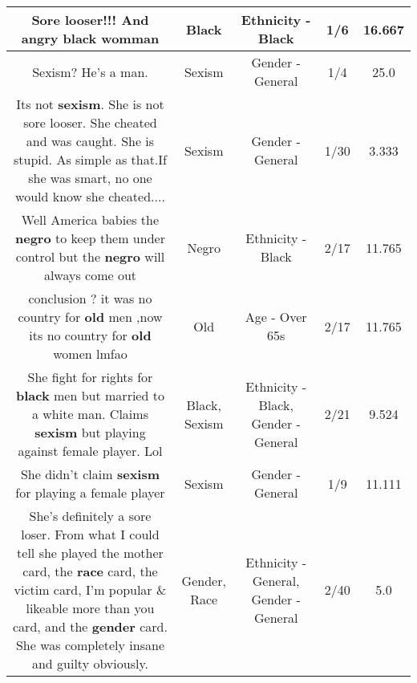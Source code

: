 \documentclass[11pt]{article}
\newlength\mylength
\begin{document}
\begin{center}
\begin{longtable}{|C{.65\mylength}|C{.30\mylength}|C{.12\mylength}|C{.12\mylength}|C{.12\mylength}|}
  \small Sore looser!!! And angry \textbf{black} womman\normalsize   & Black & Ethnicity - Black & 1/6 & 16.667 \\  \hline
  \small Sexism? He's a man.\normalsize   & Sexism & Gender - General & 1/4 & 25.0 \\  \hline
  \small Its not \textbf{sexism}. She is not sore looser. She cheated and was caught. She is stupid. As simple as that.If she was smart, no one would know she cheated....\normalsize   & Sexism & Gender - General & 1/30 & 3.333 \\  \hline
  \small Well America babies the \textbf{negro} to keep them under control but the \textbf{negro} will always come out\normalsize   & Negro & Ethnicity - Black & 2/17 & 11.765 \\  \hline
  \small conclusion  ? it was no country for \textbf{old} men ,now its no country for \textbf{old} women lmfao\normalsize   & Old & Age - Over 65s & 2/17 & 11.765 \\  \hline
  \small She fight for rights for \textbf{black} men but married to a white man. Claims \textbf{sexism} but playing against female player. Lol\normalsize   & Black, Sexism & Ethnicity - Black, Gender - General & 2/21 & 9.524 \\  \hline
  \small She didn't claim \textbf{sexism} for playing a female player\normalsize   & Sexism & Gender - General & 1/9 & 11.111 \\  \hline
  \small She's definitely a sore loser. From what I could tell she played the mother card, the \textbf{race} card, the victim card, I'm popular \& likeable more than you card, and the \textbf{gender} card. She was completely insane and guilty obviously.\normalsize   & Gender, Race & Ethnicity - General, Gender - General & 2/40 & 5.0 \\  \hline

\end{longtable}
\end{center}
\end{document}
